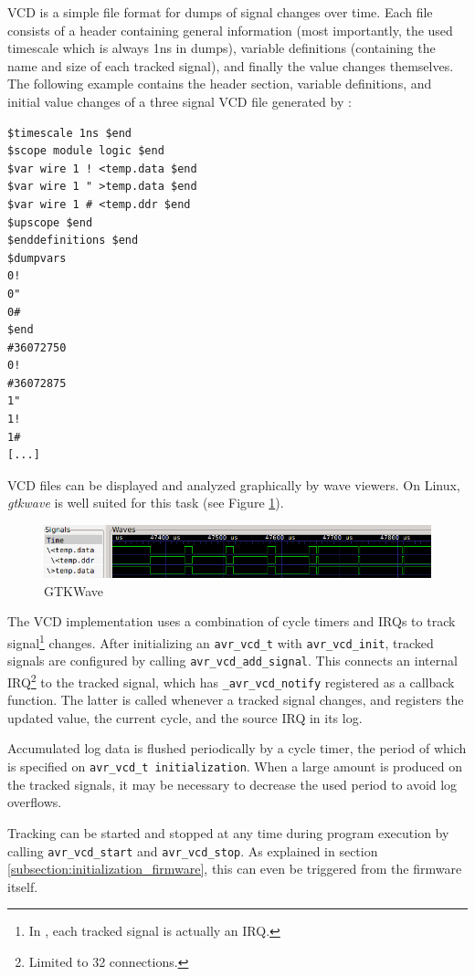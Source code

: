 \ac{VCD} is a simple file format for dumps of signal changes over time. Each file
consists of a header containing general information (most importantly, the
used timescale which is always 1ns in \simavr dumps), variable definitions
(containing the name and size of each tracked signal), and finally the value
changes themselves. The following example contains the header section, variable
definitions, and initial value changes of a three signal \ac{VCD} file generated
by \simavr:

\begin{verbatim}
$timescale 1ns $end
$scope module logic $end
$var wire 1 ! <temp.data $end
$var wire 1 " >temp.data $end
$var wire 1 # <temp.ddr $end
$upscope $end
$enddefinitions $end
$dumpvars
0!
0"
0#
$end
#36072750
0!
#36072875
1"
1!
1#
[...]
\end{verbatim}


\ac{VCD} files can be displayed and analyzed graphically by wave viewers. On Linux,
\emph{gtkwave} is well suited for this task (see Figure \ref{fig:gtkwave}).

\begin{figure}[ht]
\includegraphics[width=\textwidth]{images/gtkwave}
\caption{GTKWave}
\label{fig:gtkwave}
\end{figure}

The \simavr \ac{VCD} implementation uses a combination of cycle timers
and \acp{IRQ} to track signal\footnote{
%
In \simavr, each tracked signal is actually an \ac{IRQ}.
%
} changes. After initializing an \lstinline|avr_vcd_t|
with \lstinline|avr_vcd_init|, tracked signals are configured by calling
\lstinline|avr_vcd_add_signal|. This connects an internal \ac{IRQ}\footnote{
Limited to 32 connections.} to the tracked signal, which has
\lstinline|_avr_vcd_notify| registered as a callback function. The latter is
called whenever a tracked signal changes, and registers the updated value, the
current cycle, and the source \ac{IRQ} in its log.

Accumulated log data is flushed periodically by a cycle timer, the period of
which is specified on \lstinline|avr_vcd_t initialization|. When a large amount
is produced on the tracked signals, it may be necessary to decrease the used
period to avoid log overflows.

Tracking can be started and stopped at any time during program execution by
calling \lstinline|avr_vcd_start| and \lstinline|avr_vcd_stop|. As explained in
section \ref{subsection:initialization_firmware}, this can even be triggered from the
firmware itself.


